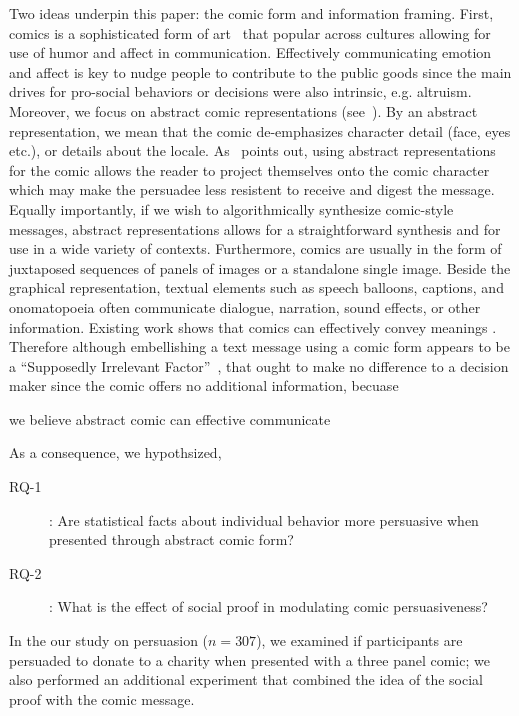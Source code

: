 Two ideas underpin this paper: the comic form and information framing. First, comics is a sophisticated form of art~\textcite{scott1993understanding} that popular across cultures allowing for use of humor and affect in communication. Effectively communicating emotion and affect is key to nudge people to contribute to the public goods since the main drives for pro-social behaviors or decisions were also intrinsic, e.g. altruism. Moreover, we focus on abstract comic representations (see~). By an abstract representation, we mean that the comic de-emphasizes character detail (face, eyes etc.), or details about the locale. As~\textcite{scott1993understanding} points out, using abstract representations for the comic allows the reader to project themselves onto the comic character which may make the persuadee less resistent to receive and digest the message. Equally importantly, if we wish to algorithmically synthesize comic-style messages, abstract representations allows for a straightforward synthesis and for use in a wide variety of contexts. Furthermore, comics are usually in the form of juxtaposed sequences of panels of images or a standalone single image. Beside the graphical representation, textual elements such as speech balloons, captions, and onomatopoeia often communicate dialogue, narration, sound effects, or other information. Existing work shows that comics can effectively convey meanings \textcite{McDermottPB18,cary2004going,scott1993understanding}. Therefore although embellishing a text message using a comic form appears to be a ``Supposedly Irrelevant Factor''~\textcite{Thaler2015}, that ought to make no difference to a decision maker since the comic offers no additional information, becuase 

we believe abstract comic can effective communicate 


As a consequence, we hypothsized,
\begin{description}
 \item[RQ-1]: Are statistical facts about individual behavior more persuasive when presented through abstract comic form?
 \item [RQ-2]: What is the effect of social proof in modulating comic persuasiveness?
\end{description} 


In the our study on persuasion ($n=307$), we examined if participants are persuaded to donate to a charity when presented with a three panel comic; we also performed an additional experiment that combined the idea of the social proof with the comic message.

